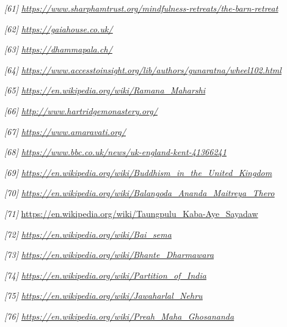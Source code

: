 \emph{{[}61{]}
\href{https://www.sharphamtrust.org/mindfulness-retreats/the-barn-retreat}{\underline{https://www.sharphamtrust.org/mindfulness-retreats/the-barn-retreat}}}

\emph{{[}62{]}
\href{https://gaiahouse.co.uk/}{\underline{https://gaiahouse.co.uk/}}}

\emph{{[}63{]}
\href{https://dhammapala.ch/}{\underline{https://dhammapala.ch/}}}

\emph{{[}64{]}
\href{https://www.accesstoinsight.org/lib/authors/gunaratna/wheel102.html}{\underline{https://www.accesstoinsight.org/lib/authors/gunaratna/wheel102.html}}}

\emph{{[}65{]}
\href{https://en.wikipedia.org/wiki/Ramana_Maharshi}{\underline{https://en.wikipedia.org/wiki/Ramana\_Maharshi}}}

\emph{{[}66{]}
\href{http://www.hartridgemonastery.org/}{\underline{http://www.hartridgemonastery.org/}}}

\emph{{[}67{]}
\href{https://www.amaravati.org/}{\underline{https://www.amaravati.org/}}}

\emph{{[}68{]}
\href{https://www.bbc.co.uk/news/uk-england-kent-41366241}{\underline{https://www.bbc.co.uk/news/uk-england-kent-41366241}}}

\emph{{[}69{]}
\href{https://en.wikipedia.org/wiki/Buddhism_in_the_United_Kingdom}{\underline{https://en.wikipedia.org/wiki/Buddhism\_in\_the\_United\_Kingdom}}}

\emph{{[}70{]}
\href{https://en.wikipedia.org/wiki/Balangoda_Ananda_Maitreya_Thero}{\underline{https://en.wikipedia.org/wiki/Balangoda\_Ananda\_Maitreya\_Thero}}}

\emph{{[}71{]}}
\url{https://en.wikipedia.org/wiki/Taungpulu_Kaba-Aye_Sayadaw}

\emph{{[}72{]}
\href{https://en.wikipedia.org/wiki/Bai_sema}{\underline{https://en.wikipedia.org/wiki/Bai\_sema}}}

\emph{{[}73{]}
\href{https://en.wikipedia.org/wiki/Bhante_Dharmawara}{\underline{https://en.wikipedia.org/wiki/Bhante\_Dharmawara}}}

\emph{{[}74{]}
\href{https://en.wikipedia.org/wiki/Partition_of_India}{\underline{https://en.wikipedia.org/wiki/Partition\_of\_India}}}

\emph{{[}75{]}
\href{https://en.wikipedia.org/wiki/Jawaharlal_Nehru}{\underline{https://en.wikipedia.org/wiki/Jawaharlal\_Nehru}}}

\emph{{[}76{]}
\href{https://en.wikipedia.org/wiki/Preah_Maha_Ghosananda}{\underline{https://en.wikipedia.org/wiki/Preah\_Maha\_Ghosananda}}}

